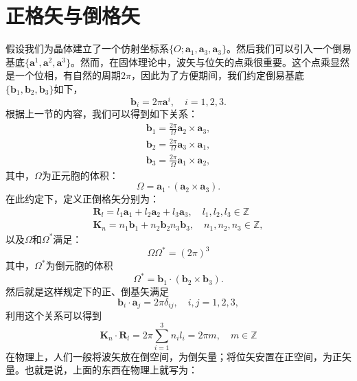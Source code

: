 \section{正格矢与倒格矢}
假设我们为晶体建立了一个仿射坐标系$\{O; \mathbf{a}_1,\mathbf{a}_3,\mathbf{a}_3\}$。然后我们可以引入一个倒易基底$\{\mathbf{a}^1,\mathbf{a}^2,\mathbf{a}^3\}$。然而，在固体理论中，波矢与位矢的点乘很重要。这个点乘显然是一个位相，有自然的周期$2\pi$，因此为了方便期间，我们约定倒易基底$\{\mathbf{b}_1,\mathbf{b}_2,\mathbf{b}_3\}$如下，
\begin{equation}
    \mathbf{b}_i = 2\pi \mathbf{a}^i, \quad i = 1,2,3.
\end{equation}
根据上一节的内容，我们可以得到如下关系：
\begin{equation}
\begin{aligned}
        \mathbf{b}_1 = \frac{2\pi}{\Omega}\mathbf{a}_2 \times \mathbf{a}_3,\\
    \mathbf{b}_2 = \frac{2\pi}{\Omega}\mathbf{a}_3 \times \mathbf{a}_1,\\
    \mathbf{b}_3 = \frac{2\pi}{\Omega}\mathbf{a}_1 \times \mathbf{a}_2,
\end{aligned}
\end{equation}
其中，$\Omega$为正元胞的体积：
\begin{equation}
    \Omega = \mathbf{a}_1 \cdot (\mathbf{a}_2 \times \mathbf{a}_3).
\end{equation}
在此约定下，定义正倒格矢分别为：
\begin{align}
    \mathbf{R}_l = l_1 \mathbf{a}_1 + l_2 \mathbf{a}_2 + l_3 \mathbf{a}_3,\quad l_1,l_2,l_3 \in \mathbb{Z}  \\
    \mathbf{K}_n = n_1 \mathbf{b}_1 + n_2 \mathbf{b}_2 n_3 \mathbf{b}_3, \quad n_1,n_2,n_3 \in \mathbb{Z},
\end{align}
以及$\Omega$和$\Omega^*$满足：
\begin{equation}
    \Omega\Omega^* = (2\pi)^3
\end{equation}
其中，$\Omega^*$为倒元胞的体积
\begin{equation}
    \Omega^* = \mathbf{b}_1 \cdot (\mathbf{b}_2\times \mathbf{b}_3).
\end{equation}
然后就是这样规定下的正、倒基矢满足
\begin{equation}
    \mathbf{b}_i \cdot \mathbf{a}_j = 2\pi \delta_{ij}, \quad i,j = 1,2,3,
\end{equation}
利用这个关系可以得到
\begin{equation}
    \mathbf{K}_n \cdot \mathbf{R}_l = 2\pi\sum_{i =1 }^3n_i l_i = 2\pi m, \quad m \in \mathbb{Z}
\end{equation}
在物理上，人们一般将波矢放在倒空间，为倒矢量；将位矢安置在正空间，为正矢量。也就是说，上面的东西在物理上就写为：

